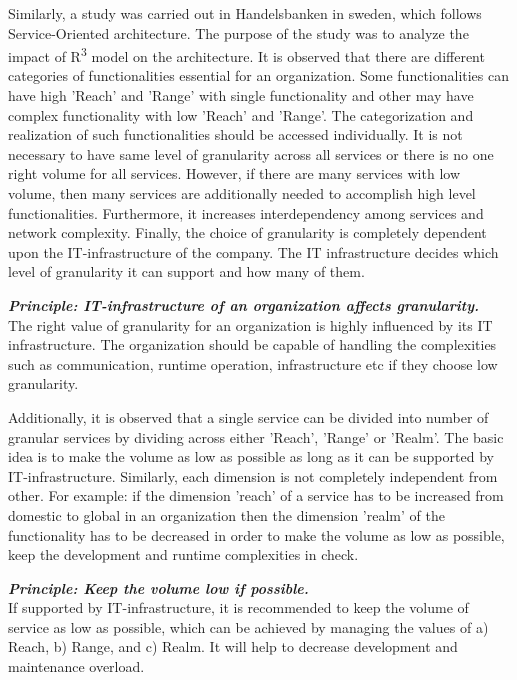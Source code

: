 Similarly, a study was carried out in Handelsbanken in sweden, which follows Service-Oriented architecture. The purpose of the study was to analyze the impact of R\textsuperscript{3} model on the architecture. It is observed that there are different categories of functionalities essential for an organization. Some functionalities can have high 'Reach' and 'Range' with single functionality and other may have complex functionality with low 'Reach' and 'Range'. The categorization and realization of such functionalities should be accessed individually. It is not necessary to have same level of granularity across all services or there is no one right volume for all services. However, if there are many services with low volume, then many services are additionally needed to accomplish high level functionalities. Furthermore, it increases interdependency among services and network complexity. Finally, the choice of granularity is completely dependent upon the IT-infrastructure of the company. The IT infrastructure decides which level of granularity it can support and how many of them. \cite{Pierre-Reldin:2007aa}


\begin{framed}
\textbf{\textit{Principle: IT-infrastructure of an organization affects granularity.}} \label{principle:granularity/IT_infrastructure}
\\
The right value of granularity for an organization is highly influenced by its IT infrastructure. The organization should be capable of handling the complexities such as communication, runtime operation, infrastructure etc if they choose low granularity. \cite{Pierre-Reldin:2007aa}
\end{framed}

Additionally, it is observed that a single service can be divided into number of granular services by dividing across either 'Reach', 'Range' or 'Realm'. The basic idea is to make the volume as low as possible as long as it can be supported by IT-infrastructure. Similarly, each dimension is not completely independent from other. For example: if the dimension 'reach' of a service has to be increased from domestic to global in an organization then the dimension 'realm' of the functionality has to be decreased in order to make the volume as low as possible, keep the development and runtime complexities in check. \cite{Pierre-Reldin:2007aa}

\begin{framed}
\textbf{\textit{Principle: Keep the volume low if possible.}}
\\
If supported by IT-infrastructure, it is recommended to keep the volume of service as low as possible, which can be achieved by managing the values of a) Reach, b) Range, and c) Realm. It will help to decrease development and maintenance overload. \cite{Pierre-Reldin:2007aa}
\end{framed}

